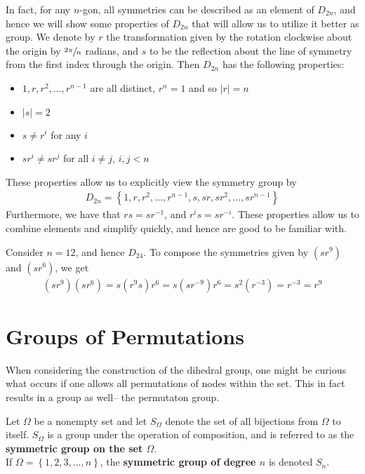 \documentclass{memoir}
\begin{document}
In fact, for any \(n\)-gon, all symmetries can be described as an element of \(D_{2n}\), and hence we will show some properties of \(D_{2n}\) that will allow us to utilize it better as group. We denote by \(r\) the transformation given by the rotation clockwise about the origin by \(\sfrac{2\pi }{n}\) radians, and \(s\) to be the reflection about the line of symmetry from the first index through the origin. Then \(D_{2n}\) has the following properties:
\begin{itemize}
	\item \(1,r,r^2,\ldots,r^{n-1}\) are all distinct, \(r^{n}=1\) and so \(\left| r \right| =n\)
	\item \(\left| s \right| =2\) 
	\item \(s \neq r^{i}\) for any \(i\) 
	\item \(sr^{i}\neq sr^{j}\) for all \(i\neq j\), \(i,j<n\)
\end{itemize}
These properties allow us to explicitly view the symmetry group by
\begin{align*}
	D_{2n}= \left\{1,r,r^2,\ldots,r^{n-1}, s,sr, s r^2,\ldots,s r^{n-1} \right\} 
\end{align*}
Furthermore, we have that \(rs = s r ^{-1}\), and \(r^{i}s = s r^{-i}\). These properties allow us to combine elements and simplify quickly, and hence are good to be familiar with.

\begin{exmp}
	Consider \(n=12\), and hence \(D_{24}\). To compose the symmetries given by \((sr^{9})\) and \((s r^{6})\), we get
	\begin{align*}
		(s r^{9}) (s r^{6}) = s (r^{9}s)r^{6} = s(s r^{-9})r^{6} = s^{2}(r^{-3}) = r^{-3} = r^{9}
	\end{align*}
\end{exmp}

\section{Groups of Permutations}
\label{sec:permutation_groups}

When considering the construction of the dihedral group, one might be curious what occurs if one allows all permutations of nodes within the set. This in fact results in a group as well-- the permutaton group.

\begin{defn}
	Let \(\Omega \) be a nonempty set and let \(S_\Omega \) denote the set of all bijections from \(\Omega \) to itself. \(S_\Omega \) is a group under the operation of composition, and is referred to as the \textbf{symmetric group on the set \(\Omega \)}.\\

	If \(\Omega  = \left\{ 1,2,3,\ldots,n \right\} \), the \textbf{symmetric group of degree \(n\)} is denoted \(S_n\).
\end{defn}
\end{document}
